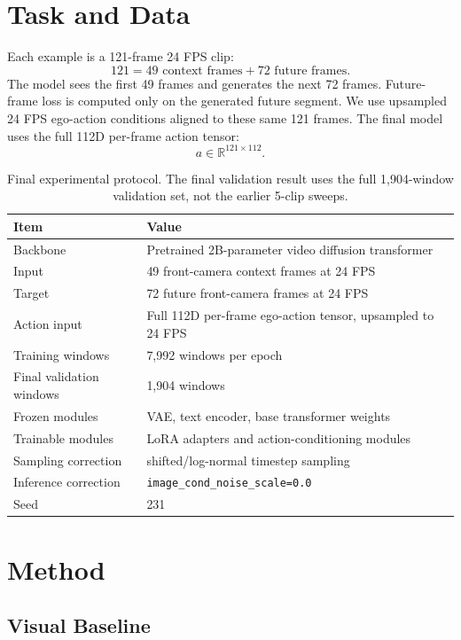 \documentclass[10pt]{article}
\begin{document}
\section{Task and Data}

Each example is a 121-frame 24 FPS clip:
\[
121 = 49 \text{ context frames} + 72 \text{ future frames}.
\]
The model sees the first 49 frames and generates the next 72 frames. Future-frame loss is computed only on the generated future segment. We use upsampled 24 FPS ego-action conditions aligned to these same 121 frames. The final model uses the full 112D per-frame action tensor:
\[
a \in \mathbb{R}^{121 \times 112}.
\]

\begin{table}[H]
\centering
\caption{Final experimental protocol. The final validation result uses the full 1,904-window validation set, not the earlier 5-clip sweeps.}
\small
\begin{tabularx}{\linewidth}{lX}
\toprule
\textbf{Item} & \textbf{Value} \\
\midrule
Backbone & Pretrained 2B-parameter video diffusion transformer \\
Input & 49 front-camera context frames at 24 FPS \\
Target & 72 future front-camera frames at 24 FPS \\
Action input & Full 112D per-frame ego-action tensor, upsampled to 24 FPS \\
Training windows & 7,992 windows per epoch \\
Final validation windows & 1,904 windows \\
Frozen modules & VAE, text encoder, base transformer weights \\
Trainable modules & LoRA adapters and action-conditioning modules \\
Sampling correction & shifted/log-normal timestep sampling \\
Inference correction & \texttt{image\_cond\_noise\_scale=0.0} \\
Seed & 231 \\
\bottomrule
\end{tabularx}
\end{table}

\section{Method}

\subsection{Visual Baseline}
\end{document}
